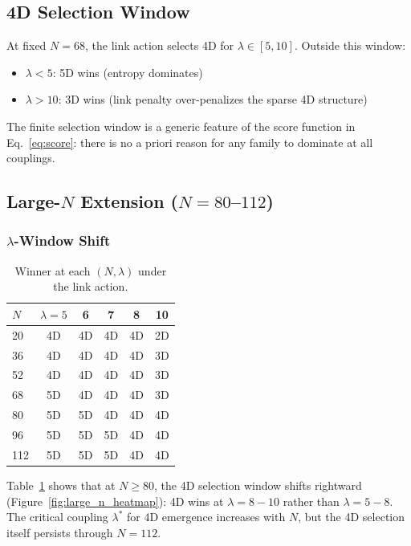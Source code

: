 \documentclass[12pt,a4paper]{article}
\begin{document}
\subsection{4D Selection Window}
\label{sec:4d_window}

At fixed $N = 68$, the link action selects 4D for $\lambda \in [5, 10]$.
Outside this window:
\begin{itemize}
  \item $\lambda < 5$: 5D wins (entropy dominates)
  \item $\lambda > 10$: 3D wins (link penalty over-penalizes the sparse 4D structure)
\end{itemize}
The finite selection window is a generic feature of the score function in
Eq.~\eqref{eq:score}: there is no a priori reason for any family to dominate
at all couplings.

\subsection{Large-$N$ Extension ($N = 80$--$112$)}
\label{sec:large_n}

\subsubsection{$\lambda$-Window Shift}
\label{sec:lambda_shift}

\begin{table}[htbp]
\centering
\caption{Winner at each $(N, \lambda)$ under the link action.}
\label{tab:large_n_winners}
\begin{tabular}{@{}lccccc@{}}
\toprule
$N$ & $\lambda{=}5$ & 6 & 7 & 8 & 10 \\
\midrule
20 & 4D & 4D & 4D & 4D & 2D \\
36 & 4D & 4D & 4D & 4D & 3D \\
52 & 4D & 4D & 4D & 4D & 3D \\
68 & 5D & 4D & 4D & 4D & 3D \\
80 & 5D & 5D & 4D & 4D & 4D \\
96 & 5D & 5D & 5D & 4D & 4D \\
112 & 5D & 5D & 5D & 4D & 4D \\
\bottomrule
\end{tabular}
\end{table}

Table~\ref{tab:large_n_winners} shows that at $N \geq 80$, the 4D selection window shifts rightward
(Figure~\ref{fig:large_n_heatmap}): 4D wins at $\lambda = 8{-}10$
rather than $\lambda = 5{-}8$. The critical coupling $\lambda^*$ for 4D emergence increases
with $N$, but the 4D selection itself persists through $N = 112$.
\end{document}
